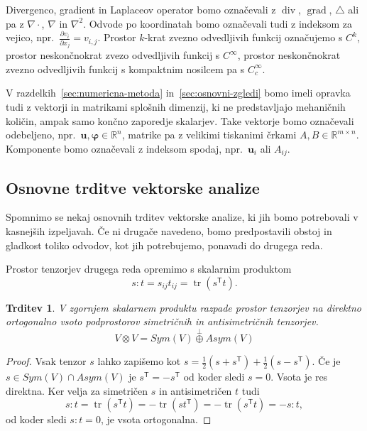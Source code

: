 \documentclass[12pt,a4paper,twoside]{article}
\theoremstyle{definition} %
\theoremstyle{plain} %
\newtheorem{trditev}[definicija]{Trditev}
\numberwithin{equation}{section}
\newcommand{\R}{\mathbb R}
\newcommand{\T}{\mathsf{T}}
\newcommand{\lap}{\triangle}
\renewcommand{\div}{\operatorname{div}}
\newcommand{\grad}{\operatorname{grad}}
\renewcommand{\b}{\boldsymbol}
\renewcommand{\phi}{\varphi}
\newcommand{\dpar}[2]{\ensuremath{\frac{\partial #1}{\partial #2}}}
\DeclareMathOperator{\tr}{tr}
\begin{document}
Divergenco, gradient in Laplaceov operator bomo označevali z $\div$, $\grad$,
$\lap$ ali pa z $\nabla\cdot$, $\nabla$ in $\nabla^2$. Odvode po koordinatah bomo označevali tudi z
indeksom za vejico, npr.~$\dpar{v_i}{x_j} = v_{i,j}$. Prostor $k$-krat zvezno odvedljivih funkcij
označujemo s $C^k$, prostor neskončnokrat zvezo odvedljivih funkcij s $C^\infty$, prostor
neskončnokrat zvezno odvedljivih funkcij s kompaktnim nosilcem pa s $C^\infty_c$.

V razdelkih~\ref{sec:numericna-metoda} in~\ref{sec:osnovni-zgledi} bomo imeli opravka tudi z
vektorji in matrikami splošnih dimenzij, ki ne predstavljajo mehaničnih količin, ampak samo končno
zaporedje skalarjev. Take vektorje bomo označevali odebeljeno, npr.~$\b u, \b\phi \in \R^{n}$,
matrike pa z velikimi tiskanimi črkami $A, B \in \R^{m\times n}$. Komponente bomo označevali z
indeksom spodaj, npr.~$\b{u}_i$ ali $A_{ij}$.

\subsection{Osnovne trditve vektorske analize}
\label{sec:uvod-tenz}
Spomnimo se nekaj osnovnih trditev vektorske analize, ki jih bomo
potrebovali v kasnejših izpeljavah. Če ni drugače navedeno, bomo predpostavili obstoj
in gladkost toliko odvodov, kot jih potrebujemo, ponavadi do drugega reda.

Prostor tenzorjev drugega reda opremimo s skalarnim produktom
\begin{equation}
   s:t = s_{ij}t_{ij} = \tr(s^\T t).
\end{equation}
\begin{trditev}
  \label{trd:dot-antisym-tensor}
  V zgornjem skalarnem produktu razpade prostor tenzorjev na direktno
  ortogonalno vsoto podprostorov simetričnih in antisimetričnih tenzorjev.
  \begin{equation}
    V\otimes V = Sym(V) \overset{\perp}{\oplus} Asym(V)
  \end{equation}
\end{trditev}
\begin{proof}
  Vsak tenzor $s$ lahko zapišemo kot $s = \frac12 (s+s^\T) + \frac12(s-s^\T)$.
  Če je $s \in Sym(V)\cap Asym(V)$ je $s^\T = -s^\T$ od koder sledi $s = 0$.
  Vsota je res direktna. Ker velja za simetričen $s$ in antisimetričen $t$ tudi
  \[ s:t = \tr(s^\T t) =  -\tr(s t^\T) = -\tr(s^\T t) = -s:t, \] od koder sledi $s:t = 0$, je vsota
  ortogonalna.
\end{proof}
\end{document}
